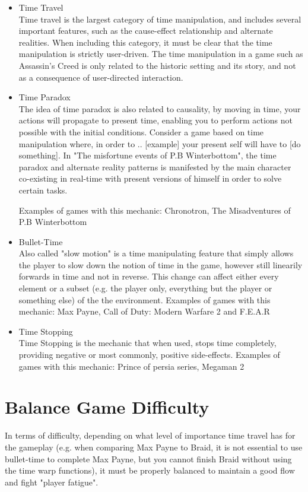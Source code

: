 \begin{itemize}
\item{Time Travel} \\ Time travel is the largest category of time manipulation, and includes several important features, 
such as the cause-effect relationship and alternate realities. When including this category, it must be clear that the 
time manipulation is strictly user-driven. The time manipulation in a game such as Assassin's Creed is only related to the historic setting and its story, and not as a consequence of user-directed interaction. 

\item{Time Paradox} \\ The idea of time paradox is also related to causality, by moving in time, 
your actions will propagate to present time, enabling you to perform actions not possible with the initial conditions. 
Consider a game based on time manipulation where, in order to .. [example] 
your present self will have to [do something]. In "The misfortune events of P.B Winterbottom", the time paradox and alternate reality 
patterns is manifested by the main character co-existing in real-time with present versions of himself in order to solve certain tasks.

Examples of games with this mechanic: Chronotron, The Misadventures of P.B Winterbottom

\item{Bullet-Time} \\ Also called "slow motion" is a time manipulating feature that simply allows the player to slow 
down the notion of time in the game, however still linearily forwards in time and not in reverse. 
This change can affect either every element or a subset (e.g. the player only, everything but the player or something else) of the the environment. 
Examples of games with this mechanic: Max Payne, Call of Duty: Modern Warfare 2 and F.E.A.R

\item{Time Stopping} \\ Time Stopping is the mechanic that when used, stops time completely, providing negative or most commonly, positive side-effects. 
Examples of games with this mechanic: Prince of persia series, Megaman 2
\end{itemize}

\section{Balance Game Difficulty}
In terms of difficulty, depending on what level of importance time travel has for the gameplay (e.g. when comparing Max Payne to Braid, it is not essential to use bullet-time to complete Max Payne, but you cannot finish Braid without using the time warp functions), it must be properly balanced to maintain a good flow and fight "player fatigue". 

